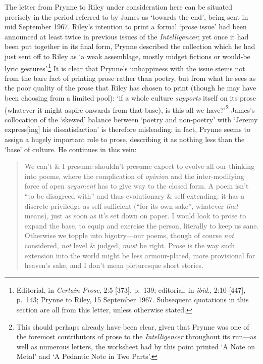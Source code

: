 \documentclass[]{article}
\begin{document}
The letter from Prynne to Riley under consideration here can be situated
precisely in the period referred to by James as `towards the end', being
sent in mid September 1967. Riley's intention to print a formal `prose
issue' had been announced at least twice in previous issues of the
\emph{Intelligencer}; yet once it had been put together in its final
form, Prynne described the collection which he had just sent off to
Riley as `a weak assemblage, mostly midget fictions or would-be lyric
gestures'.\footnote{Editorial, in \emph{Certain Prose}, 2:5 {[}373{]},
  p.~139; editorial, in \emph{ibid}., 2:10 {[}447{]}, p.~143; Prynne to
  Riley, 15 September 1967. Subsequent quotations in this section are
  all from this letter, unless otherwise stated.} It is clear that
Prynne's unhappiness with the issue stems not from the bare fact of
printing prose rather than poetry, but from what he sees as the poor
quality of the prose that Riley has chosen to print (though he may have
been choosing from a limited pool): `if a whole culture \emph{supports}
itself on its prose (whatever it might aspire onwards from that base),
is this all we have?'\footnote{This should perhaps already have been
  clear, given that Prynne was one of the foremost contributors of prose
  to the \emph{Intelligencer} throughout its run---as well as numerous
  letters, the worksheet had by this point printed `A Note on Metal' and
  `A Pedantic Note in Two Parts'.} James's collocation of the `skewed'
balance between `poetry and non-poetry' with `Jeremy express{[}ing{]}
his dissatisfaction' is therefore misleading; in fact, Prynne seems to
assign a hugely important role to prose, describing it as nothing less
than the `base' of culture. He continues in this vein:

\begin{quote}
We can't \& I presume shouldn't \sout{presume} expect to evolve all our
thinking into poems, where the complication of \emph{opinion} and the
inter-modifying force of open \emph{argument} has to give way to the
closed form. A poem isn't ``to be disagreed with'' and thus evolutionary
\& self-extending: it has a discrete priviledge as self-sufficient
(``for its own sake'', whatever \emph{that} means), just as soon as it's
set down on paper. I would look to prose to expand the base, to equip
and exercise the person, literally to keep us sane. Otherwise we topple
into bigotry---our poems, though of course \emph{not} considered,
\emph{not} level \& judged, \emph{must} be right. Prose is the way such
extension into the world might be less armour-plated, more provisional
for heaven's sake, and I don't mean picturesque short stories.
\end{quote}
\end{document}
